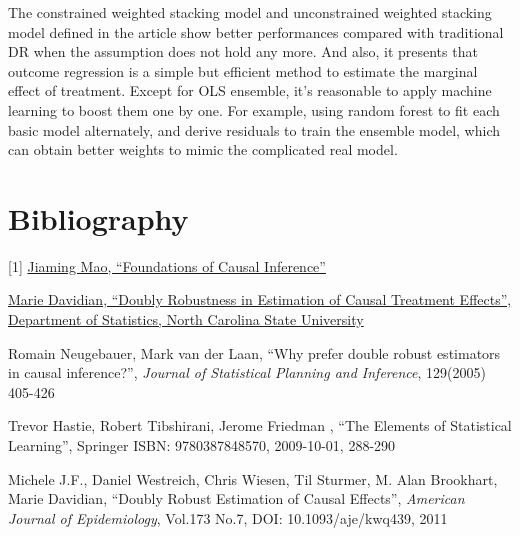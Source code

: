 \documentclass{elegantpaper}
\begin{document}
The constrained weighted stacking model and unconstrained weighted stacking model defined in the article show better performances compared with traditional DR when the assumption does not hold any more. And also, it presents that outcome regression is a simple but efficient method to estimate the marginal effect of treatment. Except for OLS ensemble, it's reasonable to apply machine learning to boost them one by one.  For example, using random forest to fit each basic model alternately, and derive residuals to train the ensemble model, which can obtain better weights to mimic the complicated real model.


\section{Bibliography}
[1] \href{https://github.com/jiamingmao/data-analysis/blob/master/Lectures/Foundations_of_Causal_Inference.pdf}{Jiaming Mao, “Foundations of Causal Inference”}

\noindent[2] \href{http://www.stat.ncsu.edu/~davidian}{Marie Davidian, “Doubly Robustness in Estimation of Causal Treatment Effects”, Department of Statistics, North Carolina State University}

\noindent[3] Romain Neugebauer, Mark van der Laan, “Why prefer double robust estimators in causal inference?”, \emph{Journal of Statistical Planning and Inference}, 129(2005) 405-426

\noindent[4] Trevor Hastie, Robert Tibshirani, Jerome Friedman , “The Elements of Statistical Learning”, Springer ISBN: 9780387848570, 2009-10-01, 288-290

\noindent[5] Michele J.F., Daniel Westreich, Chris Wiesen, Til Sturmer, M. Alan Brookhart,  Marie Davidian, “Doubly Robust Estimation of Causal Effects”, \emph{American Journal of Epidemiology}, Vol.173 No.7, DOI: 10.1093/aje/kwq439, 2011
\end{document}
